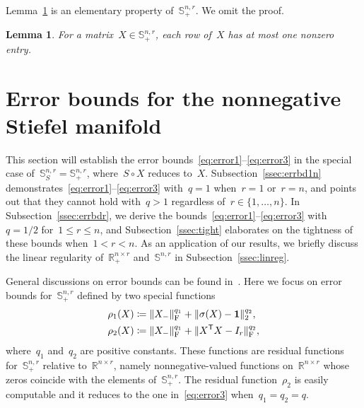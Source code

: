 \documentclass[11pt,a4paper]{article}  %
\newtheorem{lemma}{Lemma}%
\theoremstyle{definition}
\newcommand{\RR}{\mathbb{R}}
\newcommand{\res}{\rho}
\newcommand{\col}{r}
\newcommand{\stf}[1]{\mathbb{S}^{#1}}
\newcommand{\fro}{{\scriptstyle{\textnormal{F}}}}
\newcommand{\trs}{{\scriptstyle{\mathsf{T}}}}
\newcommand{\tsign}{{\scriptscriptstyle{S}}}
\newcommand{\ones}{\mathbf{1}}
\newcommand{\hp}{\circ}
\begin{document}
Lemma~\ref{lem:row} is an elementary property of~$\stf{n,\col}_+$. We omit the proof.
\begin{lemma}
    \label{lem:row}
    For a matrix~$X\in\stf{n,\col}_+$, each row of~$X$ has at most one nonzero entry.
\end{lemma}


\section{Error bounds for the nonnegative Stiefel manifold}
\label{sec:errbd}

This section will establish the error bounds~\eqref{eq:error1}--\eqref{eq:error3}
 in the special case of~$\stf{n,\col}_\tsign = \stf{n,\col}_+$, where~$S\hp X$ reduces to~$X$.
Subsection~\ref{ssec:errbd1n} demonstrates~\eqref{eq:error1}--\eqref{eq:error3}
with~$q = 1$ when~$\col=1$ or~$\col=n$, and points out that
they cannot hold with~$q>1$ regardless of~$\col\in\{1,\dots, n\}$.
In Subsection~\ref{ssec:errbdr}, we derive the bounds~\eqref{eq:error1}--\eqref{eq:error3}
with~$q={1}/{2}$ for~$1\le \col \le n$, and
Subsection~\ref{ssec:tight} elaborates on the tightness of these bounds when~$1<\col<n$.
As an application of our results, we briefly discuss the linear regularity of~$\RR^{n\times \col}_+$
and~$\stf{n,\col}$ in Subsection~\ref{ssec:linreg}.


General discussions on error bounds can be found in~\cite[Section~6.1]{Facchinei_Pang_2003a}.
Here we focus on error bounds for~$\stf{n,\col}_+$ defined by two special functions
\begin{align*}
    \res_1(X) \coloneqq\; &\|X_{-}\|_\fro^{q_1} + \|\sigma(X)-\ones\|_2^{q_2},\\
    \res_2(X) \coloneqq\; & \|X_{-}\|_\fro^{q_1} + \|X^\trs X-I_\col\|_\fro^{q_2},
\end{align*}
where~$q_1$ and~$q_2$ are positive constants.
These functions are residual functions for~$\stf{n,\col}_+$ relative to~$\RR^{n\times \col}$,
namely nonnegative-valued functions on~$\RR^{n\times \col}$ whose zeros coincide with the
elements of~$\stf{n,\col}_+$.
The residual function~$\res_2$ is easily computable and it reduces to the one in~\eqref{eq:error3} when~$q_1 = q_2 = q$.
\end{document}
